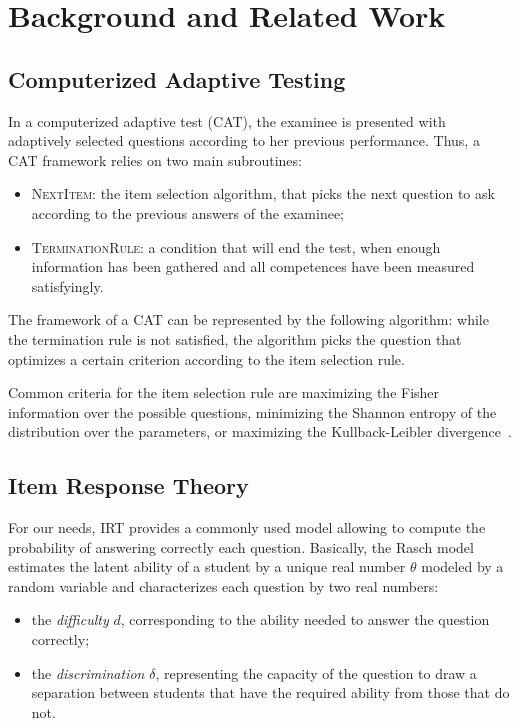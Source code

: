 \documentclass{sig-alternate}
\begin{document}
\section{Background and Related Work}

\subsection{Computerized Adaptive Testing}

In a computerized adaptive test (CAT), the examinee is presented with adaptively selected questions according to her previous performance. Thus, a CAT framework relies on two main subroutines:
\begin{itemize}
\item \textsc{NextItem}: the item selection algorithm, that picks the next question to ask according to the previous answers of the examinee;
\item \textsc{TerminationRule}: a condition that will end the test, when enough information has been gathered and all competences have been measured satisfyingly.
\end{itemize}

The framework of a CAT can be represented by the following algorithm: while the termination rule is not satisfied, the algorithm picks the question that optimizes a certain criterion according to the item selection rule.

Common criteria for the item selection rule are maximizing the Fisher information over the possible questions, minimizing the Shannon entropy of the distribution over the parameters, or maximizing the Kullback-Leibler divergence~\cite{Xu2003}. %

\subsection{Item Response Theory}

For our needs, IRT provides a commonly used model allowing to compute the probability of answering correctly each question. Basically, the Rasch model estimates the latent ability of a student by a unique real number $\theta$ modeled by a random variable and characterizes each question by two real numbers:

\begin{itemize}
\item the \emph{difficulty} $d$, corresponding to the ability needed to answer the question correctly;
\item the \emph{discrimination} $\delta$, representing the capacity of the question to draw a separation between students that have the required ability from those that do not.
\end{itemize}
\end{document}
